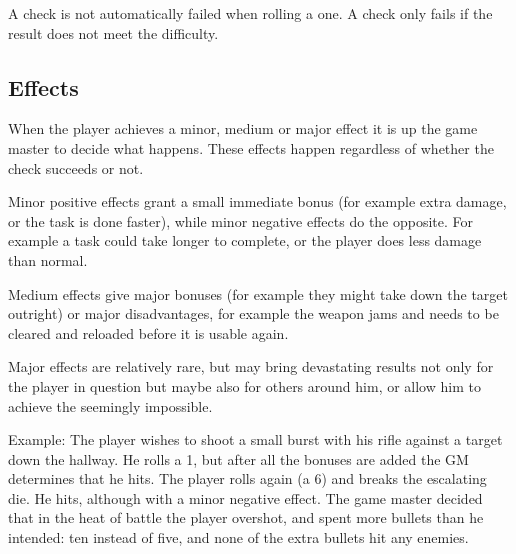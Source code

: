 A check is not automatically failed when rolling a one. A check only fails if
the result does not meet the difficulty.

\subsection{Effects}

When the player achieves a minor, medium or major effect it is up the game
master to decide what happens. These effects happen regardless of whether the
check succeeds or not.

Minor positive effects grant a small immediate bonus (for example extra
damage, or the task is done faster), while minor negative effects do the
opposite. For example a task could take longer to complete, or the player
does less damage than normal.

Medium effects give major bonuses (for example they might take down the target
outright) or major disadvantages, for example the weapon jams and needs to be
cleared and reloaded before it is usable again.

Major effects are relatively rare, but may bring devastating results not only
for the player in question but maybe also for others around him, or allow him
to achieve the seemingly impossible.

Example: The player wishes to shoot a small burst with his rifle against a
target down the hallway. He rolls a 1, but after all the bonuses are added
the GM determines that he hits. The player rolls again (a 6) and breaks the
escalating die. He hits, although with a minor negative effect. The game
master decided that in the heat of battle the player overshot, and spent
more bullets than he intended: ten instead of five, and none of the extra
bullets hit any enemies.
